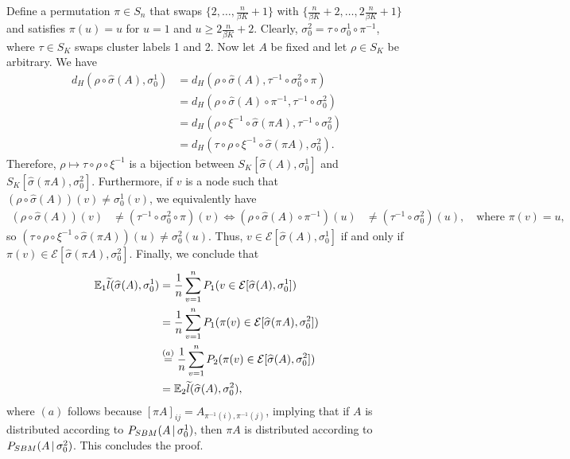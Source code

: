 \documentclass{article}
\begin{document}
Define a permutation $\pi \in S_n$ that swaps $\{2, \dots, \frac{n}{\beta K} + 1\}$ with $\{ \frac{n}{\beta K} + 2, \dots, 2 \frac{n}{\beta K} + 1\}$ and satisfies $\pi(u) = u$ for $u = 1$ and $u \geq 2 \frac{n}{\beta K} + 2$. Clearly, $\sigma_0^2 = \tau \circ \sigma_0^1 \circ \pi^{-1}$, where $\tau \in S_K$ swaps cluster labels 1 and 2. Now let $A$ be fixed and let $\rho \in S_K$ be arbitrary. We have
\begin{align*}
d_H( \rho \circ \hat{\sigma}(A), \sigma_0^1) &= 
  d_H( \rho \circ \hat{\sigma}(A), \tau^{-1} \circ \sigma_0^2 \circ \pi)\\
  &= d_H( \rho \circ \hat{\sigma}(A) \circ \pi^{-1}, 
                     \tau^{-1} \circ \sigma_0^2) \\
  &= d_H( \rho \circ \xi^{-1} \circ \hat{\sigma}(\pi A), 
              \tau^{-1} \circ \sigma_0^2) \\
  &= d_H( \tau \circ \rho \circ \xi^{-1} \circ \hat{\sigma}(\pi A), \sigma_0^2).
\end{align*}
Therefore, $\rho \mapsto \tau \circ \rho \circ \xi^{-1}$ is a bijection between $S_K[\hat{\sigma}(A), \sigma_0^1]$ and $S_K[\hat{\sigma}(\pi A), \sigma_0^2]$. Furthermore, if $v$ is a node such that $(\rho \circ \hat{\sigma}(A))(v) \neq \sigma_0^1(v)$, we equivalently have
\begin{align*}
(\rho \circ \hat{\sigma}(A))(v) &\neq (\tau^{-1} \circ \sigma_0^2 \circ \pi) (v) \iff (\rho \circ \hat{\sigma}(A) \circ \pi^{-1} )(u) &\neq (\tau^{-1} \circ \sigma_0^2 )(u), \quad \textrm{where $\pi(v) = u$},
\end{align*}
so $(\tau \circ \rho \circ \xi^{-1} \circ \hat{\sigma}(\pi A)) (u) \neq
 \sigma_0^2(u)$. Thus, $v \in \mathcal{E}[\hat{\sigma}(A), \sigma_0^1]$ if and only if $\pi(v) \in \mathcal{E}[\hat{\sigma}(\pi A), \sigma_0^2]$.  Finally, we conclude that
\begin{align*}
{\mathbb E}_1 \widetilde{l}(\widehat{\sigma}(A), \sigma_0^1) &= 
      \frac{1}{n} \sum_{v = 1}^n P_1 ( v \in \mathcal{E}[\widehat{\sigma}(A), \sigma_0^1]) \\
   &= \frac{1}{n} \sum_{v=1}^n  P_1 ( \pi(v) \in \mathcal{E}[\widehat{\sigma}(\pi A), \sigma_0^2]) \\
   &\stackrel{(a)} = \frac{1}{n} \sum_{v=1}^n P_2( \pi(v) \in  \mathcal{E}[\widehat{\sigma}(A), \sigma_0^2] ) \\
   &= {\mathbb E}_2 \widetilde{l} (\widehat{\sigma}(A), \sigma_0^2),
\end{align*}
where $(a)$ follows because $[\pi A]_{ij} = A_{\pi^{-1}(i), \pi^{-1}(j)}$, implying that if $A$ is distributed according to $P_{SBM}(A {\,|\,} \sigma_0^1)$, then $\pi A$ is distributed according to $P_{SBM}(A {\,|\,} \sigma_0^2)$. This concludes the proof.
\end{document}

